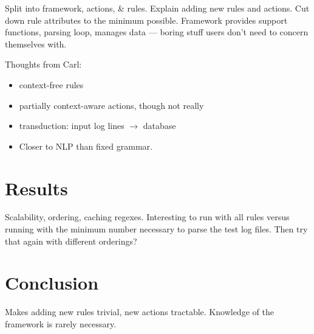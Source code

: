 \documentclass[]{svmult}
\begin{document}
Split into framework, actions, \& rules.  Explain adding new rules and
actions.  Cut down rule attributes to the minimum possible.  Framework
provides support functions, parsing loop, manages data --- boring stuff
users don't need to concern themselves with.

Thoughts from Carl: 

\begin{itemize}

    \item context-free rules

    \item partially context-aware actions, though not really

    \item transduction: input log lines $\rightarrow$ database

    \item Closer to NLP than fixed grammar.

\end{itemize}

\section{Results}

Scalability, ordering, caching regexes.  Interesting to run with all rules
versus running with the minimum number necessary to parse the test log
files.  Then try that again with different orderings?

\section{Conclusion}

Makes adding new rules trivial, new actions tractable.  Knowledge of the
framework is rarely necessary.

\appendix

\cite{postfix}



\label{bibliography}
\end{document}
